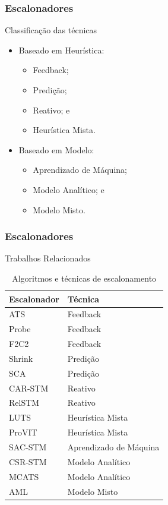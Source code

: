 \documentclass[10pt, pdf,xcolor=pdftex,dvipsnames,table]{beamer}
\begin{document}
\begin{frame} \frametitle{Escalonadores}
\begin{block}{Classificação das técnicas}
\begin{itemize}
	\item Baseado em Heurística:
	\begin{itemize}
	    \item Feedback;
	    \item Predição;
	    \item Reativo; e
	    \item Heurística Mista.
	\end{itemize}
	\item Baseado em Modelo:
	\begin{itemize}
	    \item Aprendizado de Máquina;
	    \item Modelo Analítico; e
	    \item Modelo Misto.
	\end{itemize}
\end{itemize}
\end{block}
\end{frame}


\begin{frame} \frametitle{Escalonadores}
\begin{block}{Trabalhos Relacionados}
\begin{table}[]
\footnotesize
\centering
\caption{Algoritmos e técnicas de escalonamento}
\label{tab:compare}
\begin{tabular}{l|l}
\hline
Escalonador & Técnica \\ \hline
ATS & Feedback \\
Probe & Feedback \\
F2C2 & Feedback \\
Shrink & Predição \\
SCA & Predição \\
CAR-STM & Reativo \\
RelSTM & Reativo \\
LUTS & Heurística Mista \\
ProVIT & Heurística Mista \\
SAC-STM & Aprendizado de Máquina \\
CSR-STM & Modelo Analítico \\
MCATS & Modelo Analítico \\
AML & Modelo Misto \\
\hline
\end{tabular}
\end{table}
\end{block}
\end{frame}
\end{document}
